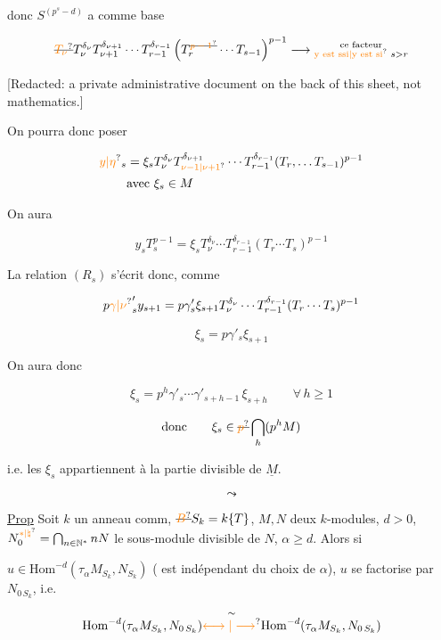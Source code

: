 donc $S^{(p^s-d)}$ a comme base

\[
\deleted{\unsure{T_\nu}}T_\nu^{\delta_\nu}T_{\nu+1}^{\delta_{\nu+1}}\cdots T_{r-1}^{\delta_{r-1}}
\left(T_r^{\deleted{\unsure{p-1}}}\cdots T_{s-1}\right)^{p-1}
\longrightarrow\substack{\text{ce facteur}\\\text{\unsure{y est ssi|y est si} }s>r}
\]

[Redacted: a private administrative document on the back of this sheet, not mathematics.]


On pourra donc poser

\[
\begin{aligned}
\unsure{y|\eta}_s&=\xi_s T_\nu^{\delta_\nu}T_{\unsure{\nu-1|\nu+1}}^{\delta_{\nu+1}}\cdots T_{r-1}^{\delta_{r-1}}(T_r,\ldots T_{s-1})^{p-1}\\
&\text{avec }\xi_s\in M
\end{aligned}
\]

On aura

\[
y_s T_s^{p-1}=\xi_s T_\nu^{\delta_\nu}\cdots T_{r-1}^{\delta_{r-1}}(T_r\cdots T_s)^{p-1}
\]

La relation $(R_s)$ s'écrit donc, comme

\[
p\unsure{\gamma|\nu}'_s y_{s+1}=p\gamma'_s\xi_{s+1}T_\nu^{\delta_\nu}\cdots T_{r-1}^{\delta_{r-1}}(T_r\cdots T_s)^{p-1}
\]

\[
\boxed{\xi_s=p\gamma'_s\xi_{s+1}}
\]

On aura donc

\[
\xi_s=p^h\gamma'_s\cdots\gamma'_{s+h-1}\,\xi_{s+h}\qquad\forall\,h\geq1
\]

\[
\text{donc}\qquad \xi_s\in\deleted{\unsure{p}}\bigcap_h(p^h M)
\]

i.e. les $\xi_s$ appartiennent à la partie divisible de $\underline{M}$.

\[
\leadsto
\]

\uline{Prop} Soit $k$ un anneau comm, $\deleted{\unsure{B}}S_k=k\{T\}$, $M,N$ deux $k$-modules,  $d>0$, $N_0^{\unsure{*|\natural}}=\bigcap_{n\in\mathbb{N}^{*}}nN$ le   sous-module divisible de $N$, $\alpha\geq d$. Alors si

$u\in\mathrm{Hom}^{-d}(\tau_\alpha M_{S_k},N_{S_k})$ (  est indépendant  du choix de $\alpha$), $u$ se factorise par $N_{0\,S_k}$, i.e.

\[
\mathrm{Hom}^{-d}(\tau_\alpha M_{S_k},N_{0\,S_k})\overset{\sim}{\unsure{\longleftrightarrow|\longrightarrow}}\mathrm{Hom}^{-d}(\tau_\alpha M_{S_k},N_{0\,S_k})
\]

